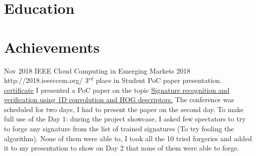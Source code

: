 \documentclass[10pt]{article} %
\begin{document}

\section{Education}





\section{Achievements}

\job
{Nov 2018}{}
{IEEE Cloud Computing in Emerging Markets 2018}
{http://2018.ieeeccem.org/}
{3$^{rd}$ place in Student PoC paper presentation. \href{https://drive.google.com/file/d/0B6RJRgHLk-CHS0pHREdmczRJZUxhRmF1Mk1va1oxUjZZbzlj/view?usp=sharing}{certificate}}
{I presented a PoC paper on the topic \href{https://drive.google.com/file/d/1EsZuI-OXfA8jqWlqR0KJepeyxaUbABOe/view?usp=sharing}{Signature recognition and verification using 1D convolution and HOG descriptors.} The conference was scheduled for two days, I had to present the paper on the second day. To make full use of the Day 1: during the project showcase, I asked few spectators to try to forge any signature from the list of trained signatures (To try fooling the algorithm). None of them were able to, I took all the 10 tried forgeries and added it to my presentation to show on Day 2 that none of them were able to forge.}

\end{document}
